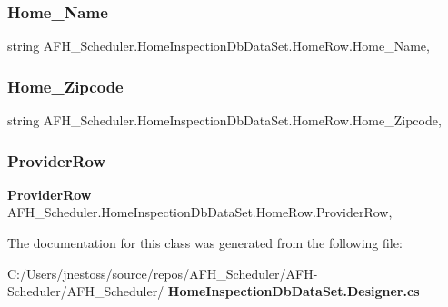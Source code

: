 \subsubsection{Home\_Name}
{\footnotesize\ttfamily string A\+F\+H\+\_\+\+Scheduler.\+Home\+Inspection\+Db\+Data\+Set.\+Home\+Row.\+Home\+\_\+\+Name\hspace{0.3cm}{\ttfamily [get]}, {\ttfamily [set]}}

\mbox{\label{class_a_f_h___scheduler_1_1_home_inspection_db_data_set_1_1_home_row_a965a4a030c775685cd937da99046239f}} 
\subsubsection{Home\_Zipcode}
{\footnotesize\ttfamily string A\+F\+H\+\_\+\+Scheduler.\+Home\+Inspection\+Db\+Data\+Set.\+Home\+Row.\+Home\+\_\+\+Zipcode\hspace{0.3cm}{\ttfamily [get]}, {\ttfamily [set]}}

\mbox{\label{class_a_f_h___scheduler_1_1_home_inspection_db_data_set_1_1_home_row_ad2fdcccdd4cc0ab6a72e4a6f2535ecce}} 
\subsubsection{ProviderRow}
{\footnotesize\ttfamily \textbf{ Provider\+Row} A\+F\+H\+\_\+\+Scheduler.\+Home\+Inspection\+Db\+Data\+Set.\+Home\+Row.\+Provider\+Row\hspace{0.3cm}{\ttfamily [get]}, {\ttfamily [set]}}



The documentation for this class was generated from the following file\+:\begin{DoxyCompactItemize}
\item 
C\+:/\+Users/jnestoss/source/repos/\+A\+F\+H\+\_\+\+Scheduler/\+A\+F\+H-\/\+Scheduler/\+A\+F\+H\+\_\+\+Scheduler/\textbf{ Home\+Inspection\+Db\+Data\+Set.\+Designer.\+cs}\end{DoxyCompactItemize}
